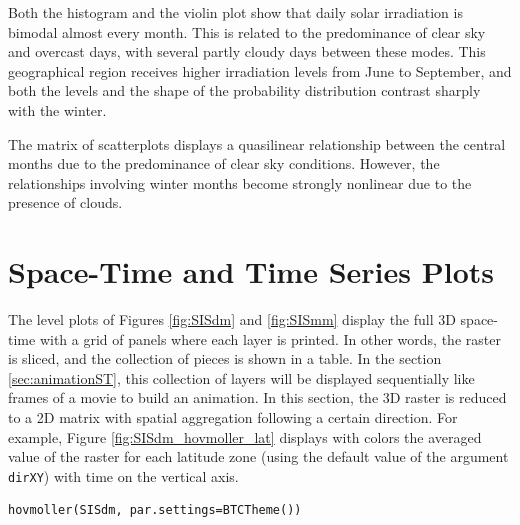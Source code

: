 \documentclass[smallroyalvopaper]{memoir}
\begin{document}
Both the histogram and the violin plot show that daily solar
irradiation is bimodal almost every month. This is related to the
predominance of clear sky and overcast days, with several partly
cloudy days between these modes. This geographical region receives
higher irradiation levels from June to September, and both the levels
and the shape of the probability distribution contrast sharply with
the winter.

The matrix of scatterplots displays a quasilinear relationship
between the central months due to the predominance of clear sky
conditions. However, the relationships involving winter months become
strongly nonlinear due to the presence of clouds.
\section{Space-Time and Time Series Plots}
\label{sec-4}
The level plots of Figures \ref{fig:SISdm} and \ref{fig:SISmm}
display the full 3D space-time with a grid of panels where each layer
is printed. In other words, the raster is sliced, and the collection of
pieces is shown in a table. In the section \ref{sec:animationST}, this
collection of layers will be displayed sequentially like frames of a
movie to build an animation. In this section, the 3D raster is reduced
to a 2D matrix with spatial aggregation following a certain
direction. For example, Figure \ref{fig:SISdm_hovmoller_lat}
displays with colors the averaged value of the raster for each
latitude zone (using the default value of the argument \texttt{dirXY}) with
time on the vertical axis.


\lstset{language=R,numbers=none}
\begin{lstlisting}
hovmoller(SISdm, par.settings=BTCTheme())
\end{lstlisting}
\end{document}
